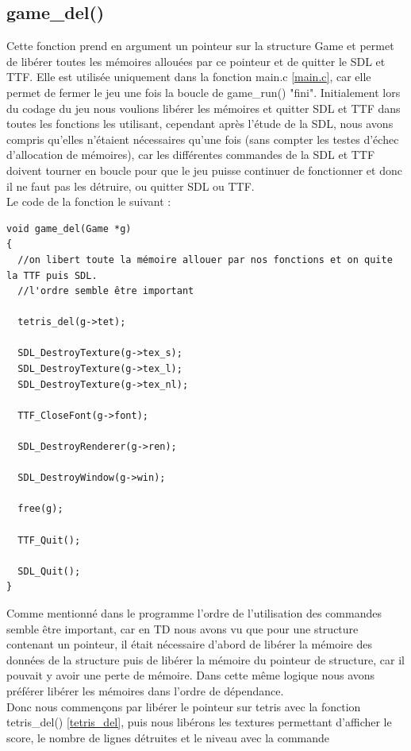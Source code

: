 \documentclass[a4paper,10p]{report}
\begin{document}
\subsection{game\_del()}
\label{game_del}
Cette fonction prend en argument un pointeur sur la structure Game et permet de libérer toutes les mémoires allouées par ce pointeur et de quitter le SDL et TTF. Elle est utilisée uniquement dans la fonction main.c \ref{main.c}, car elle permet de fermer le jeu une fois la boucle de game\_run() "fini". Initialement lors du codage du jeu nous voulions libérer les mémoires et quitter SDL et TTF dans toutes les fonctions les utilisant, cependant après l'étude de la SDL, nous avons compris qu'elles n'étaient nécessaires qu'une fois (sans compter les testes d'échec d'allocation de mémoires), car les différentes commandes de la SDL et TTF doivent tourner en boucle pour que le jeu puisse continuer de fonctionner et donc il ne faut pas les détruire, ou quitter SDL ou TTF.
\\Le code de la fonction le suivant :
\begin{lstlisting}
void game_del(Game *g)
{
  //on libert toute la mémoire allouer par nos fonctions et on quite la TTF puis SDL.
  //l'ordre semble être important
  
  tetris_del(g->tet);
  
  SDL_DestroyTexture(g->tex_s);
  SDL_DestroyTexture(g->tex_l);
  SDL_DestroyTexture(g->tex_nl);

  TTF_CloseFont(g->font);
  
  SDL_DestroyRenderer(g->ren);
  
  SDL_DestroyWindow(g->win);
  
  free(g);

  TTF_Quit();

  SDL_Quit();
}
\end{lstlisting}
Comme mentionné dans le programme l'ordre de l'utilisation des commandes semble être important, car en TD nous avons vu que pour une structure contenant un pointeur, il était nécessaire d'abord de libérer la mémoire des données de la structure puis de libérer la mémoire du pointeur de structure, car il pouvait y avoir une perte de mémoire. Dans cette même logique nous avons préférer libérer les mémoires dans l'ordre de dépendance.
\\Donc nous commençons par libérer le pointeur sur tetris avec la fonction tetris\_del() \ref{tetris_del}, puis nous libérons les textures permettant d'afficher le score, le nombre de lignes détruites et le niveau avec la commande
\end{document}
